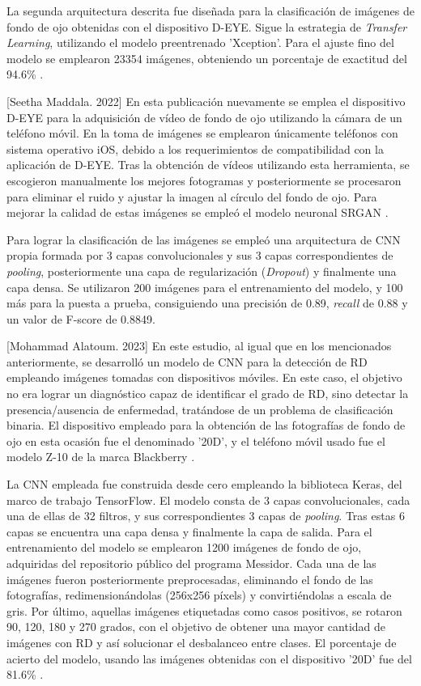 La segunda arquitectura descrita fue diseñada para la clasificación de imágenes de fondo de ojo obtenidas con el dispositivo D-EYE. Sigue la estrategia de \textit{Transfer Learning}, utilizando el modelo preentrenado 'Xception'. Para el ajuste fino del modelo se emplearon 23354 imágenes, obteniendo un porcentaje de exactitud del 94.6\% \cite{soa:mohamed}.

[Seetha Maddala. 2022] En esta publicación nuevamente se emplea el dispositivo D-EYE para la adquisición de vídeo de fondo de ojo utilizando la cámara de un teléfono móvil. En la toma de imágenes se emplearon únicamente teléfonos con sistema operativo iOS, debido a los requerimientos de compatibilidad con la aplicación de D-EYE. Tras la obtención de vídeos utilizando esta herramienta, se escogieron manualmente los mejores fotogramas y posteriormente se procesaron para eliminar el ruido y ajustar la imagen al círculo del fondo de ojo. Para mejorar la calidad de estas imágenes se empleó el modelo neuronal SRGAN \cite{soa:seetha}. 

Para lograr la clasificación de las imágenes se empleó una arquitectura de CNN propia formada por 3 capas convolucionales y sus 3 capas correspondientes de \textit{pooling}, posteriormente una capa de regularización (\textit{Dropout}) y finalmente una capa densa. Se utilizaron 200 imágenes para el entrenamiento del modelo, y 100 más para la puesta a prueba, consiguiendo una precisión de 0.89, \textit{recall} de 0.88 y un valor de F-score de 0.8849.

[Mohammad Alatoum. 2023] En este estudio, al igual que en los mencionados anteriormente, se desarrolló un modelo de CNN para la detección de RD empleando imágenes tomadas con dispositivos móviles. En este caso, el objetivo no era lograr un diagnóstico capaz de identificar el grado de RD, sino detectar la presencia/ausencia de enfermedad, tratándose de un problema de clasificación binaria. El dispositivo empleado para la obtención de las fotografías de fondo de ojo en esta ocasión fue el denominado '20D', y el teléfono móvil usado fue el modelo Z-10 de la marca Blackberry \cite{soa:mohammad}.

La CNN empleada fue construida desde cero empleando la biblioteca Keras, del marco de trabajo TensorFlow. El modelo consta de 3 capas convolucionales, cada una de ellas de 32 filtros, y sus correspondientes 3 capas de \textit{pooling}. Tras estas 6 capas se encuentra una capa densa y finalmente la capa de salida. Para el entrenamiento del modelo se emplearon 1200 imágenes de fondo de ojo, adquiridas del repositorio público del programa Messidor. Cada una de las imágenes fueron posteriormente preprocesadas, eliminando el fondo de las fotografías, redimensionándolas (256x256 píxels) y convirtiéndolas a escala de gris. Por último, aquellas imágenes etiquetadas como casos positivos, se rotaron 90, 120, 180 y 270 grados, con el objetivo de obtener una mayor cantidad de imágenes con RD y así solucionar el desbalanceo entre clases. El porcentaje de acierto del modelo, usando las imágenes obtenidas con el dispositivo '20D' fue del 81.6\% \cite{soa:mohammad}.

